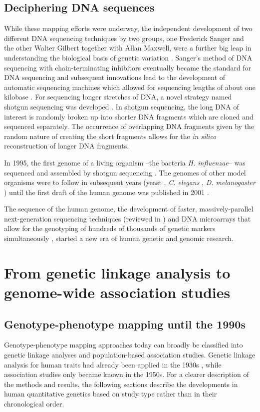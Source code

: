 \subsection{Deciphering DNA sequences}
While these mapping efforts were underway, the independent development of two different DNA sequencing techniques by two groups, one Frederick Sanger and the other Walter Gilbert together with Allan Maxwell, were a further big leap in understanding the biological basis of genetic variation \citep{Sanger1977,Maxam1977}. Sanger's method of DNA sequencing with chain-terminating inhibitors eventually became the standard for DNA sequencing and subsequent innovations lead to the development of automatic sequencing machines which allowed for sequencing lengths of about one kilobase \citep{Hunkapiller1991}. For sequencing longer stretches of DNA, a novel strategy named shotgun sequencing was developed \citep{Staden1979,Anderson1981}. In shotgun sequencing, the long DNA of interest is randomly broken up into shorter DNA fragments which are cloned and sequenced separately. The occurrence of overlapping DNA fragments given by the random nature of creating the short fragments allows for the \textit{in silico} reconstruction of longer DNA fragments.

In 1995, the first genome of a living organism --the bacteria \textit{H. influenzae}-- was sequenced and assembled by shotgun sequencing \citep{Fleischmann1995}. The genomes of other model organisms were to follow in subsequent years (yeast \citep{Goffeau1996}, \textit{C. elegans} \citep{C.elegans1998}, \textit{D. melanogaster} \citep{Adams2000}) until the first draft of the human genome was published in 2001 \citep{Lander2001}. 

The sequence of the human genome, the development of faster, massively-parallel next-generation sequencing techniques (reviewed in \citep{Shendure2008,Heather2016}) and DNA microarrays that allow for the genotyping of hundreds of thousands of genetic markers simultaneously \citep{Wang1998}, started a new era of human genetic and genomic research. 

\section{From genetic linkage analysis to genome-wide association studies}
\subsection{Genotype-phenotype mapping until the 1990s}
Genotype-phenotype mapping approaches today can broadly be classified into genetic linkage analyses and population-based association studies. Genetic linkage analysis for human traits had already been applied in the 1930s \citep{Bernstein1930,Penrose1935}, while association studies only became known in the 1950s. For a clearer description of the methods and results, the following sections describe the developments in human quantitative genetics based on study type rather than in their chronological order. 

